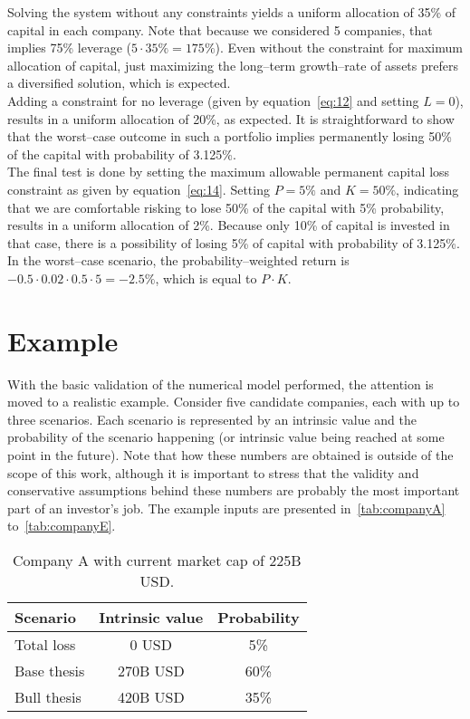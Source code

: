\documentclass{article}
\begin{document}
\indent Solving the system without any constraints yields a uniform allocation
of 35\% of capital in each company. Note that because we considered 5 companies,
that implies 75\% leverage ($5 \cdot 35\% = 175\%$). Even without the
constraint for maximum allocation of capital, just maximizing the long--term
growth--rate of assets prefers a diversified solution, which is expected.\\

\indent Adding a constraint for no leverage (given by equation~\eqref{eq:12} and
setting $L = 0$), results in a uniform allocation of 20\%, as expected. It is
straightforward to show that the worst--case outcome in such a portfolio implies
permanently losing 50\% of the capital with probability of 3.125\%.\\

\indent The final test is done by setting the maximum allowable permanent
capital loss constraint as given by equation~\eqref{eq:14}. Setting $P = 5\%$
and $K = 50\%$, indicating that we are comfortable risking to lose 50\% of the
capital with 5\% probability, results in a uniform allocation of 2\%. Because
only 10\% of capital is invested in that case, there is a possibility of losing
5\% of capital with probability of 3.125\%. In the worst--case scenario, the
probability--weighted return is $-0.5 \cdot 0.02 \cdot 0.5 \cdot 5 = -2.5\%$,
which is equal to $P \cdot K$.

\section{Example}
\label{sec:example}

\noindent With the basic validation of the numerical model performed, the
attention is moved to a realistic example. Consider five candidate companies,
each with up to three scenarios. Each scenario is represented by an intrinsic
value and the probability of the scenario happening (or intrinsic value being
reached at some point in the future). Note that how these numbers are obtained
is outside of the scope of this work, although it is important to stress that
the validity and conservative assumptions behind these numbers are probably the
most important part of an investor's job. The example inputs are presented
in~\autoref{tab:companyA} to~\autoref{tab:companyE}.

\begin{table}[!ht]
\caption{Company A with current market cap of 225B USD.}
\vspace{0.25cm}
\centering
\begin{tabular}{l|c|c}
Scenario & Intrinsic value & Probability \\
\hline
Total loss & 0 USD & 5\% \\
Base thesis & 270B USD & 60\% \\
Bull thesis & 420B USD & 35\% \\
\end{tabular}%
\label{tab:companyA}%
\end{table}%
\end{document}
